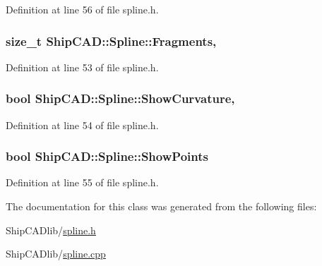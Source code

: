Definition at line 56 of file spline.\-h.

\hypertarget{classShipCAD_1_1Spline_a5e4df2a54955094c035f32a442602afc}{
\subsubsection[{Fragments}]{\setlength{\rightskip}{0pt plus 5cm}size\-\_\-t Ship\-C\-A\-D\-::\-Spline\-::\-Fragments\hspace{0.3cm}{\ttfamily [read]}, {\ttfamily [write]}}}\label{classShipCAD_1_1Spline_a5e4df2a54955094c035f32a442602afc}


Definition at line 53 of file spline.\-h.

\hypertarget{classShipCAD_1_1Spline_a9572e31014a04689a2987475c9bff080}{
\subsubsection[{Show\-Curvature}]{\setlength{\rightskip}{0pt plus 5cm}bool Ship\-C\-A\-D\-::\-Spline\-::\-Show\-Curvature\hspace{0.3cm}{\ttfamily [read]}, {\ttfamily [write]}}}\label{classShipCAD_1_1Spline_a9572e31014a04689a2987475c9bff080}


Definition at line 54 of file spline.\-h.

\hypertarget{classShipCAD_1_1Spline_abac1aad3fc0e33ea8ccda1a94bea8467}{
\subsubsection[{Show\-Points}]{\setlength{\rightskip}{0pt plus 5cm}bool Ship\-C\-A\-D\-::\-Spline\-::\-Show\-Points}}\label{classShipCAD_1_1Spline_abac1aad3fc0e33ea8ccda1a94bea8467}


Definition at line 55 of file spline.\-h.



The documentation for this class was generated from the following files\-:\begin{DoxyCompactItemize}
\item 
Ship\-C\-A\-Dlib/\hyperlink{spline_8h}{spline.\-h}\item 
Ship\-C\-A\-Dlib/\hyperlink{spline_8cpp}{spline.\-cpp}\end{DoxyCompactItemize}
